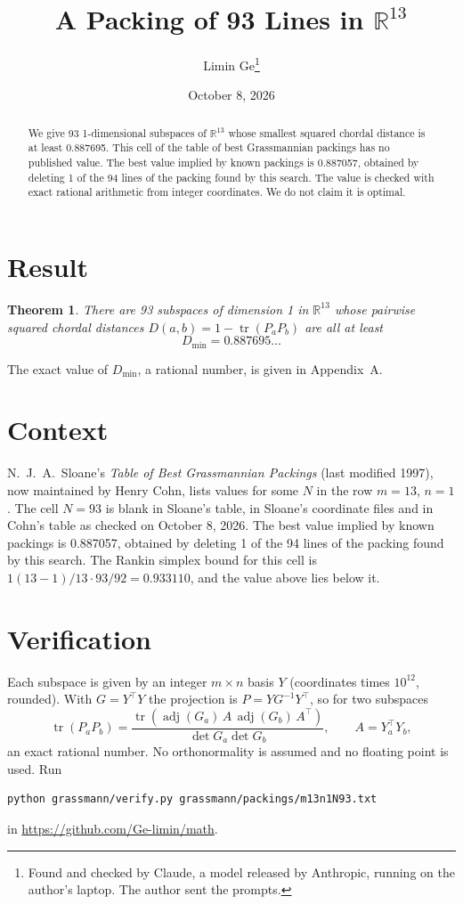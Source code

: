 \documentclass[11pt,a4paper]{article}
\title{A Packing of 93 Lines in $\mathbb{R}^{13}$}
\author{Limin Ge\thanks{Found and checked by Claude, a model released by Anthropic, running on the author's laptop. The author sent the prompts.}}
\date{October 8, 2026}
\newtheorem*{theorem}{Theorem}
\begin{document}
\maketitle
\begin{abstract}
We give 93 1-dimensional subspaces of $\mathbb{R}^{13}$ whose smallest squared chordal distance is at least 0.887695. This cell of the table of best Grassmannian packings has no published value. The best value implied by known packings is 0.887057, obtained by deleting 1 of the 94 lines of the packing found by this search. The value is checked with exact rational arithmetic from integer coordinates. We do not claim it is optimal.
\end{abstract}

\section{Result}
\begin{theorem}
There are 93 subspaces of dimension 1 in $\mathbb{R}^{13}$ whose pairwise squared chordal distances $D(a,b) = 1 - \operatorname{tr}(P_aP_b)$ are all at least
\[ D_{\min} = 0.887695\ldots \]
\end{theorem}
The exact value of $D_{\min}$, a rational number, is given in Appendix~A.


\section{Context}
N.~J.~A.~Sloane's \emph{Table of Best Grassmannian Packings} (last modified 1997), now maintained by Henry Cohn, lists values for some $N$ in the row $m=13$, $n=1$. The cell $N=93$ is blank in Sloane's table, in Sloane's coordinate files and in Cohn's table as checked on October 8, 2026. The best value implied by known packings is 0.887057, obtained by deleting 1 of the 94 lines of the packing found by this search. The Rankin simplex bound for this cell is $1(13-1)/13\cdot 93/92 = 0.933110$, and the value above lies below it.


\section{Verification}
Each subspace is given by an integer $m\times n$ basis $Y$ (coordinates times $10^{12}$, rounded). With $G=Y^\top Y$ the projection is $P=YG^{-1}Y^\top$, so for two subspaces
\[ \operatorname{tr}(P_aP_b)=\frac{\operatorname{tr}(\operatorname{adj}(G_a)\,A\,\operatorname{adj}(G_b)\,A^\top)}{\det G_a\det G_b},\qquad A=Y_a^\top Y_b, \]
an exact rational number. No orthonormality is assumed and no floating point is used. Run
\begin{verbatim}
python grassmann/verify.py grassmann/packings/m13n1N93.txt
\end{verbatim}
in \url{https://github.com/Ge-limin/math}.
\end{document}
